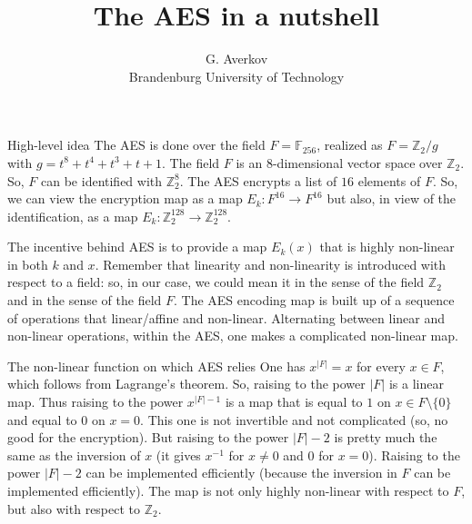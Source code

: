 \documentclass{beamer}
\title{The AES in a nutshell}
\author{G. Averkov \\ Brandenburg University of Technology}
\newcommand{\Z}{\mathbb{Z}}
\newcommand{\F}{\mathbb{F}}
\begin{document}
\begin{frame}[plain]
    \maketitle
\end{frame}

\begin{frame}{High-level idea} 
	The AES is done over the field $F = \F_{256}$, realized as $F  = \Z_2 / g$ with $g = t^8 + t^4 + t^3 + t +1$. 
	The  field $F$ is an $8$-dimensional vector space over $\Z_2$. So, $F$ can be identified with $\Z_2^{8}$. The AES encrypts a list of $16$ elements of $F$. So, we can view the encryption map as a map $E_k : F^{16} \to F^{16}$ but also, in view of the identification, as a map $E_k : \Z_2^{128} \to \Z_2^{128}$. 
\end{frame} 

\begin{frame}
The incentive behind AES is to provide a map $E_k(x)$ that is highly non-linear in both $k$ and $x$. Remember that linearity and non-linearity is introduced with respect to a field: so, in our case, we could mean it in the sense of the field $\Z_2$ and in the sense of the field  $F$. The AES encoding map is built up of a sequence of operations that linear/affine and non-linear. Alternating between linear and non-linear operations,  within the AES, one makes a complicated non-linear map. 
\end{frame} 


\begin{frame}{The non-linear function on which AES relies} 
	One has $x^{|F|} = x$ for every $x \in F$, which follows from Lagrange's theorem. So, raising to the power $|F|$ is a linear map. Thus raising to the power $x^{|F|-1}$ is a map that is equal to $1$ on $x \in F \setminus \{0\}$ and equal to $0$ on $x=0$. This one is not invertible and not complicated (so, no good for the encryption). But raising to the power $|F|-2$ is pretty much the same as the inversion of $x$ (it gives $x^{-1}$ for $x \ne 0$ and $0$ for $x =0$). Raising to the power $|F|-2$ can be implemented efficiently (because the inversion in $F$ can be implemented efficiently). The map is not only highly non-linear with respect to $F$, but also with respect to $\Z_2$. 
\end{frame} 
\end{document}
